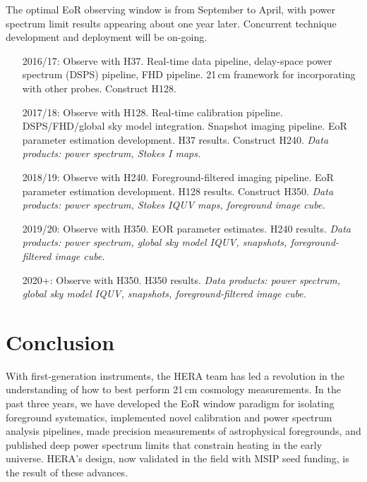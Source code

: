 \documentclass[preprint,11pt]{aastex}
\begin{document}
The optimal EoR observing window is from September to April, with power spectrum limit results appearing about one year later.  Concurrent technique development and deployment will be on-going.
\begin{itemize}[leftmargin=0.7in]
\item[2016/17:] Observe with H37.  Real-time data pipeline, delay-space power spectrum (DSPS) pipeline, FHD pipeline.  21\,cm framework for incorporating with other probes. Construct H128.
\item[2017/18:] Observe with H128.  Real-time calibration pipeline.  DSPS/FHD/global sky model integration. Snapshot imaging pipeline.  EoR parameter estimation development.  H37 results.  Construct H240.  {\em Data products:  power spectrum, Stokes I maps.}
\item[2018/19:] Observe with H240.  Foreground-filtered imaging pipeline.  EoR parameter estimation development.   H128 results. Construct H350.  {\em Data products:  power spectrum, Stokes IQUV maps, foreground image cube.}
\item[2019/20:] Observe with H350.  EOR parameter estimates.  H240 results.  {\em Data products:  power spectrum, global sky model IQUV, snapshots, foreground-filtered image cube.}
\item[2020+:] Observe with H350.  H350 results.  {\em Data products:  power spectrum, global sky model IQUV, snapshots, foreground-filtered image cube.}
\end{itemize}

\section{Conclusion}
\label{sec:conclusion}

\noindent With first-generation instruments, the HERA team has led a revolution in the understanding of how to best perform 21\,cm cosmology measurements.
In the past three years, we have developed the EoR window paradigm for isolating foreground systematics, implemented novel
calibration and power spectrum analysis pipelines, made precision measurements of astrophysical foregrounds, and published deep power 
spectrum limits that constrain heating in the early universe.  HERA's design, now validated in the field with MSIP seed funding, 
is the result of these advances.
\end{document}
